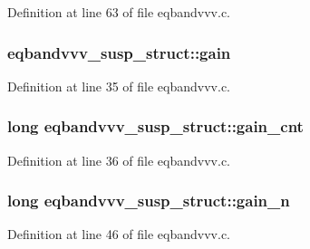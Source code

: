 Definition at line 63 of file eqbandvvv.\+c.

\subsubsection[{\texorpdfstring{gain}{gain}}]{ eqbandvvv\+\_\+susp\+\_\+struct\+::gain}\hypertarget{structeqbandvvv__susp__struct_a7183925f088ed1e250e9e6a313e29a26}{}\label{structeqbandvvv__susp__struct_a7183925f088ed1e250e9e6a313e29a26}


Definition at line 35 of file eqbandvvv.\+c.

\subsubsection[{\texorpdfstring{gain\+\_\+cnt}{gain_cnt}}]{\setlength{\rightskip}{0pt plus 5cm}long eqbandvvv\+\_\+susp\+\_\+struct\+::gain\+\_\+cnt}\hypertarget{structeqbandvvv__susp__struct_a1c8a63bf2805f0090179a32791faad5d}{}\label{structeqbandvvv__susp__struct_a1c8a63bf2805f0090179a32791faad5d}


Definition at line 36 of file eqbandvvv.\+c.

\subsubsection[{\texorpdfstring{gain\+\_\+n}{gain_n}}]{\setlength{\rightskip}{0pt plus 5cm}long eqbandvvv\+\_\+susp\+\_\+struct\+::gain\+\_\+n}\hypertarget{structeqbandvvv__susp__struct_a3dfa2902ec1a5f10b1fec7412264b3d0}{}\label{structeqbandvvv__susp__struct_a3dfa2902ec1a5f10b1fec7412264b3d0}


Definition at line 46 of file eqbandvvv.\+c.

